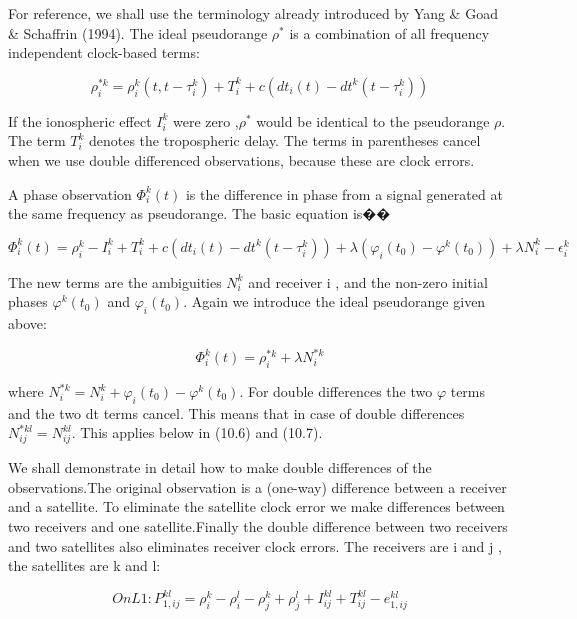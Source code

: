 For reference, we shall use the terminology already introduced by Yang \& Goad \& Schaffrin (1994). The ideal pseudorange $\rho^{*}$ is a combination of all frequency independent clock-based terms:

\begin{equation}
\rho_{i}^{*k}=\rho_{i}^{k}(t,t-\tau_{i}^{k})+T_{i}^{k}+c(dt_{i}(t)-dt^{k}(t-\tau_{i}^{k}))
\end{equation}

If the ionospheric effect $I_{i}^{k}$ were zero ,$\rho^{*}$ would be identical to the pseudorange $\rho$. The term $T_{i}^{k}$ denotes the tropospheric delay. The terms in parentheses cancel when we use double differenced observations, because these are clock errors.

A phase observation $\Phi_{i}^{k}(t)$ is the difference in phase from a signal generated at the same frequency as pseudorange. The basic equation is��

\begin{equation}
\Phi_{i}^{k}(t)=\rho_{i}^{k}-I_{i}^{k}+T_{i}^{k}+c(dt_{i}(t)-dt^{k}(t-\tau_{i}^{k}))+\lambda(\varphi_{i}(t_{0})-\varphi^{k}(t_{0}))+\lambda N_{i}^{k}-\epsilon_{i}^{k}
\end{equation}

The new terms are the ambiguities $N_{i}^{k}$ and receiver i , and the non-zero initial phases $\varphi^{k}(t_{0})$ and $\varphi_{i}(t_{0})$. Again we introduce the ideal pseudorange given above:

\begin{equation}
\Phi_{i}^{k}(t)=\rho_{i}^{*k}+\lambda N_{i}^{*k}
\end{equation}

where $N_{i}^{*k}=N_{i}^{k}+\varphi_{i}(t_{0})-\varphi^{k}(t_{0})$. For double differences the two $\varphi$ terms and the two dt terms cancel. This means that in case of double differences $N_{ij}^{*kl}=N_{ij}^{kl}$. This applies below in (10.6) and (10.7).

We shall demonstrate in detail how to make double differences of the observations.The original observation is a (one-way) difference between a receiver and a satellite. To eliminate the satellite clock error we make differences between two receivers and one satellite.Finally the double difference between two receivers and two satellites also eliminates receiver clock errors. The receivers are i and j , the satellites are k and l:

\begin{equation}
On L1: P_{1,ij}^{kl}=\rho_{i}^{k}-\rho_{i}^{l}-\rho_{j}^{k}+\rho_{j}^{l}+I_{ij}^{kl}+T_{ij}^{kl}-e_{1,ij}^{kl}
\end{equation}


